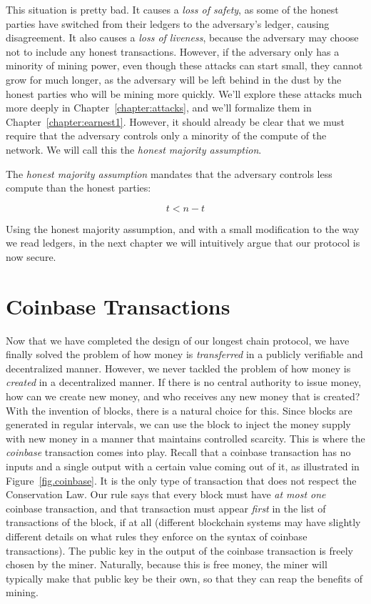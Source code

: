 This situation is pretty bad. It causes a \emph{loss of safety}, as some of the honest parties have
switched from their ledgers to the adversary's ledger, causing disagreement. It also causes a
\emph{loss of liveness}, because the adversary may choose not to include any honest transactions.
However, if the adversary
only has a minority of mining power, even though these attacks can start small, they cannot grow
for much longer, as the adversary will be left behind in the dust by the honest parties who will
be mining more quickly.
We'll explore these attacks much more deeply in Chapter~\ref{chapter:attacks},
and we'll formalize them in Chapter~\ref{chapter:earnest1}. However, it should already be clear
that we must require that the adversary controls only a minority of the compute of the network.
We will call this the \emph{honest majority assumption}.

\begin{definition}
  The \emph{honest majority assumption} mandates that the adversary controls less compute than
  the honest parties:

  \[
    t < n - t
  \]
\end{definition}

Using the honest majority assumption, and with a small modification to the way we read ledgers,
in the next chapter we will intuitively argue that our protocol is now secure.

\section{Coinbase Transactions}

Now that we have completed the design of our longest chain protocol, we have finally solved the
problem of how money is \emph{transferred} in a publicly verifiable and decentralized manner.
However, we never tackled the problem of how money is \emph{created} in a decentralized manner.
If there is no central authority to issue money, how can we create new money, and who receives
any new money that is created? With the invention of blocks, there is a natural choice for this.
Since blocks are generated in regular intervals, we can use the block to inject the money supply
with new money in a manner that maintains controlled scarcity.
This is where the \emph{coinbase} transaction comes into play.
Recall that a coinbase transaction has no inputs and a single output with a certain value coming
out of it, as illustrated in Figure~\ref{fig.coinbase}.
It is the only type of transaction that does not respect the Conservation Law.
Our rule says that every block
must have \emph{at most one} coinbase transaction, and that transaction must appear \emph{first} in
the list of transactions of the block, if at all (different blockchain systems may have slightly
different details on what rules they enforce on the syntax of coinbase transactions).
The public key in the output of the coinbase transaction is freely chosen by the miner.
Naturally, because this is free money, the miner will typically make that public key
be their own, so that they can reap the benefits of mining.


